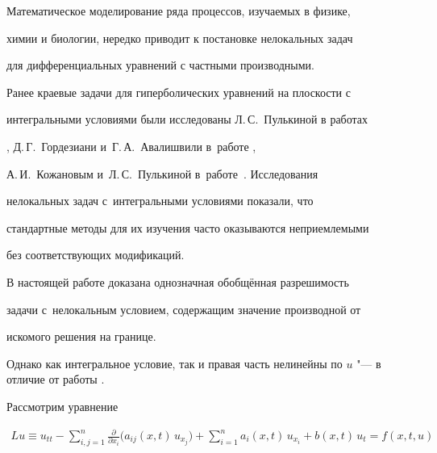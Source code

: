 \maketitle







Математическое моделирование ряда процессов, изучаемых в физике,


химии и биологии, нередко приводит к постановке нелокальных задач


для дифференциальных уравнений с частными производными.


Ранее краевые задачи для гиперболических уравнений на плоскости с


интегральными условиями были исследованы Л.\,С.~Пулькиной  в работах


\cite{dm:2, dm:5}, Д.\,Г.~Гордезиани и~Г.\,А.~Авалишвили  в~работе \cite{dm:1},


А.\,И.~Кожановым  и~Л.\,С.~Пулькиной в~работе~\cite{dm:9}. Исследования


нелокальных задач с~интегральными условиями показали, что


стандартные методы для их изучения часто оказываются неприемлемыми


без соответствующих модификаций.





В настоящей работе доказана однозначная обобщённая разрешимость


задачи с~нелокальным условием, содержащим значение производной от


искомого решения на границе.


Однако как интегральное условие, так и правая часть нелинейны по $u$ "--- в отличие от работы \cite{dm:b1}.







Рассмотрим уравнение


\begin{eqnarray}


\label{dmitr:g1} Lu\equiv


u_{tt}-\sum\limits_{i,j=1}^n\frac{\partial}{\partial


x_i}\biggl(a_{ij}(x,t)\,u_{x_j}\biggr)+


\sum\limits_{i=1}^na_i(x,t)\,u_{x_i}+b(x,t)\,u_t=f(x,t,u)


\end{eqnarray}


